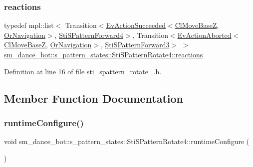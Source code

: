 \subsubsection{\texorpdfstring{reactions}{reactions}}
{\footnotesize\ttfamily typedef mpl\+::list$<$ Transition$<$\hyperlink{structsmacc_1_1default__events_1_1EvActionSucceeded}{Ev\+Action\+Succeeded}$<$\hyperlink{classcl__move__base__z_1_1ClMoveBaseZ}{Cl\+Move\+BaseZ}, \hyperlink{classsm__dance__bot_1_1OrNavigation}{Or\+Navigation}$>$, \hyperlink{structsm__dance__bot_1_1s__pattern__states_1_1StiSPatternForward4}{Sti\+S\+Pattern\+Forward4}$>$, Transition$<$\hyperlink{structsmacc_1_1default__events_1_1EvActionAborted}{Ev\+Action\+Aborted}$<$\hyperlink{classcl__move__base__z_1_1ClMoveBaseZ}{Cl\+Move\+BaseZ}, \hyperlink{classsm__dance__bot_1_1OrNavigation}{Or\+Navigation}$>$, \hyperlink{structsm__dance__bot_1_1s__pattern__states_1_1StiSPatternForward3}{Sti\+S\+Pattern\+Forward3}$>$ $>$ \hyperlink{structsm__dance__bot_1_1s__pattern__states_1_1StiSPatternRotate4_a79688efd233c787e1328cd13a5fd0166}{sm\+\_\+dance\+\_\+bot\+::s\+\_\+pattern\+\_\+states\+::\+Sti\+S\+Pattern\+Rotate4\+::reactions}}



Definition at line 16 of file sti\+\_\+spattern\+\_\+rotate\+\_.\+h.



\subsection{Member Function Documentation}
\mbox{\label{structsm__dance__bot_1_1s__pattern__states_1_1StiSPatternRotate4_a157355f75ecc6feaaefd500f5270e37a}} 
\subsubsection{\texorpdfstring{runtime\+Configure()}{runtimeConfigure()}}
{\footnotesize\ttfamily void sm\+\_\+dance\+\_\+bot\+::s\+\_\+pattern\+\_\+states\+::\+Sti\+S\+Pattern\+Rotate4\+::runtime\+Configure (\begin{DoxyParamCaption}{ }\end{DoxyParamCaption})\hspace{0.3cm}{\ttfamily [inline]}}



